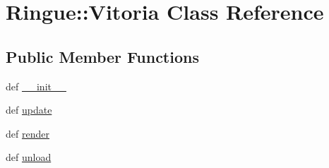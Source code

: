 \hypertarget{class_ringue_1_1_vitoria}{
\section{Ringue::Vitoria Class Reference}
\label{class_ringue_1_1_vitoria}
}
\subsection*{Public Member Functions}
\begin{CompactItemize}
\item 
def \hyperlink{class_ringue_1_1_vitoria_c3e15c7ffa70671e3a04426dad66a321}{\_\-\_\-init\_\-\_\-}
\item 
def \hyperlink{class_ringue_1_1_vitoria_4fff1903c138ae1b6abba2631f183421}{update}
\item 
def \hyperlink{class_ringue_1_1_vitoria_27823de6222df64854273e30db874e81}{render}
\item 
def \hyperlink{class_ringue_1_1_vitoria_ac1d90801a9d567cc801e5710f22ebf5}{unload}
\end{CompactItemize}

